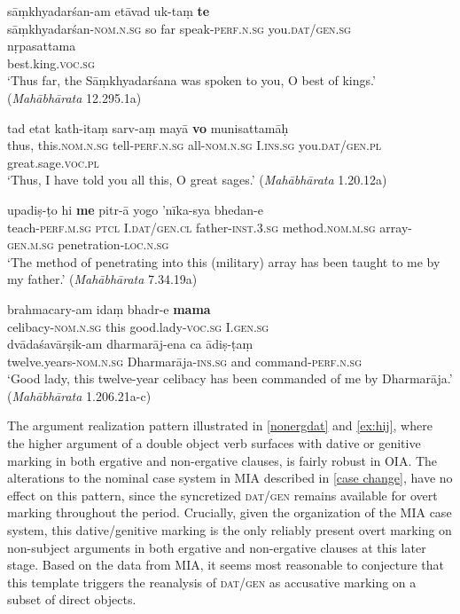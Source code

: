 \documentclass[output=paper,
modfonts
]{LSP/langsci}
\begin{document}
\begin{exe}
\ex\label{ex:hij}
\begin{xlist}
\ex\label{ex:samkh}\gll sāṃkhyadarśan-am etāvad uk-taṃ \textbf{te} \\
sāṃkhyadarśan-\textsc{nom.n.sg} {so far} speak-\textsc{perf.n.sg} you.\textsc{dat/gen.sg}  \\

\gll nṛpasattama \\ 
best.king.\textsc{voc.sg} \\
\glt `Thus far, the Sāṃkhyadarśana was spoken to you, O best of kings.' (\textit{Mahābhārata} 12.295.1a)

\ex\label{ex:tad}\gll tad etat kath-itaṃ sarv-aṃ mayā \textbf{vo} munisattamāḥ \\
thus, this.\textsc{nom.n.sg} tell-\textsc{perf.n.sg} all-\textsc{nom.n.sg} I.\textsc{ins.sg} you.\textsc{dat/gen.pl} great.sage.\textsc{voc.pl} \\
\glt `Thus, I have told you all this, O great sages.'  (\textit{Mahābhārata} 1.20.12a)

\ex\label{ex:upadisto}\gll upadiṣ-ṭo hi \textbf{me} pitr-ā yogo 'nīka-sya bhedan-e \\ teach-\textsc{perf.m.sg} \textsc{ptcl} I.\textsc{dat/gen.cl} father-\textsc{inst.3.sg} method.\textsc{nom.m.sg} array-\textsc{gen.m.sg} penetration-\textsc{loc.n.sg} \\
\glt `The method of penetrating into this (military) array has been taught to me by my father.'   (\textit{Mahābhārata}  7.34.19a)

\ex\label{ex:brahmacaryam}\gll brahmacary-am idaṃ bhadr-e \textbf{mama} \\
celibacy-\textsc{nom.n.sg} this good.lady-\textsc{voc.sg} I.\textsc{gen.sg}\\

\gll dvādaśavārṣik-am dharmarāj-ena ca ādiṣ-ṭaṃ \\
twelve.years-\textsc{nom.n.sg} Dharmarāja-\textsc{ins.sg} and command-\textsc{perf.n.sg} \\  \glt `Good lady, this  twelve-year celibacy  has been commanded of me by Dharmarāja.' (\textit{Mahābhārata} 1.206.21a-c)
\end{xlist}
\end{exe}


The argument realization pattern illustrated in \cref{nonergdat} and  \cref{ex:hij}, where the higher argument of a double object verb surfaces  with  dative or genitive marking in both ergative and non-ergative clauses, is fairly robust in OIA. The alterations to the nominal case system in MIA  described in \cref{case change}, have no effect on this pattern, since the syncretized \textsc{dat/gen}  remains available for overt marking throughout the period. Crucially, given the organization of the MIA case system, this dative/genitive marking is the only reliably present  overt marking on non-subject arguments in both ergative and non-ergative clauses at this later stage.  Based on the data from MIA, it seems most reasonable to conjecture  that this template triggers the reanalysis of \textsc{dat/gen}  as accusative marking on a subset of  direct objects. 
\end{document}
